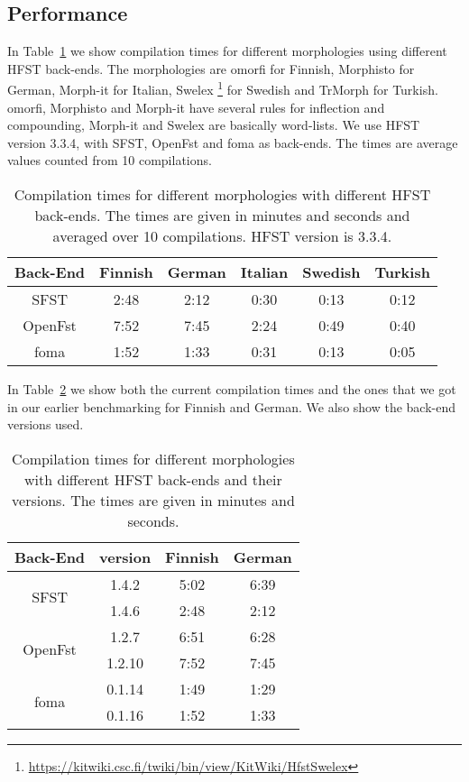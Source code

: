 \documentclass{llncs}
\begin{document}
\subsection{Performance}

In Table~\ref{tab:compilation_times} we show compilation times for different 
morphologies using different HFST back-ends. The morphologies are omorfi 
\cite{pirinen/2008} for Finnish, Morphisto \cite{zielinski/2009} for German,
Morph-it \cite{Zanchetta_2005-1} for Italian, Swelex 
\footnote{\url{https://kitwiki.csc.fi/twiki/bin/view/KitWiki/HfstSwelex}} 
for Swedish and TrMorph \cite{Coltekin/2010} for Turkish. 
omorfi, Morphisto and Morph-it have several rules for
inflection and compounding, Morph-it and Swelex are basically word-lists.
We use HFST version 3.3.4, with SFST, OpenFst and foma as
back-ends. The times are average values counted from 10 compilations.


\begin{table} [h!]
\centering
  \caption{Compilation times for different morphologies with
    different HFST back-ends. The times are given in minutes and seconds
    and averaged over 10 compilations. HFST version is 3.3.4.}
  \begin{tabular}{| c | c | c | c | c | c |}
    \hline
    Back-End & Finnish & German & Italian & Swedish & Turkish \\ \hline\hline
    SFST & 2:48 & 2:12 & 0:30 & 0:13 & 0:12 \\ \hline
    OpenFst & 7:52 & 7:45 & 2:24 & 0:49 & 0:40 \\ \hline
    foma & 1:52 & 1:33 & 0:31 & 0:13 & 0:05 \\ \hline
    \end{tabular}
  \label{tab:compilation_times}
\end{table}


In Table~\ref{tab:compilation_times_versions} we show both the current compilation 
times and the ones that we got in our earlier benchmarking \cite{hfst/2011} for 
Finnish and German. We also show the back-end versions used.

\begin{table} [h!]
\centering
  \caption{Compilation times for different morphologies with
    different HFST back-ends and their versions. 
    The times are given in minutes and seconds.}
  \begin{tabular}{| c | c | c | c |}
  \hline
  Back-End                 & version  & Finnish  & German \\ \hline\hline
  \multirow{2}{*}{SFST}    & 1.4.2    & 5:02     & 6:39 \\
                           & 1.4.6    & 2:48     & 2:12 \\ \hline
  \multirow{2}{*}{OpenFst} & 1.2.7    & 6:51     & 6:28 \\
                           & 1.2.10   & 7:52     & 7:45 \\ \hline
  \multirow{2}{*}{foma}    & 0.1.14   & 1:49     & 1:29 \\
                           & 0.1.16   & 1:52     & 1:33 \\
\hline
  \end{tabular}
  \label{tab:compilation_times_versions}
\end{table}
\end{document}
